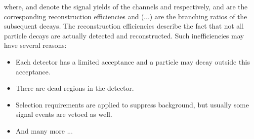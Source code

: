 where, \NDp and \NLc denote the signal yields of the channels \LbToDpmunuX and \LbToLcmunu respectively, \effDp and \effLc are the corresponding reconstruction efficiencies and \BR(...) are the branching ratios of the subsequent decays.
The reconstruction efficiencies describe the fact that not all particle decays are actually detected and reconstructed.
Such inefficiencies may have several reasons:
\begin{itemize}
    \item Each detector has a limited acceptance and a particle may decay outside this acceptance.
    \item There are dead regions in the detector.
    \item Selection requirements are applied to suppress background, but usually some signal events are vetoed as well.
    \item And many more ...
\end{itemize}

